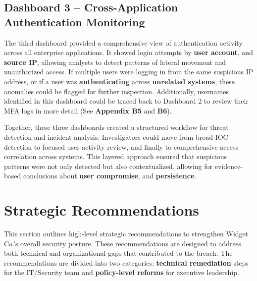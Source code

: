\documentclass[11pt]{article}
\begin{document}
	\subsection{Dashboard 3 – Cross-Application Authentication Monitoring}
	
	\hspace{1.5em} The third dashboard provided a comprehensive view of authentication activity across all enterprise applications. It showed login attempts by \textbf{user account}, and \textbf{source IP}, allowing analysts to detect patterns of lateral movement and unauthorized access. If multiple users were logging in from the same suspicious IP address, or if a user was \textbf{authenticating} across \textbf{unrelated systems}, these anomalies could be flagged for further inspection. Additionally, usernames identified in this dashboard could be traced back to Dashboard 2 to review their MFA logs in more detail (See \textbf{Appendix B5} and \textbf{B6}).
	
	\vspace{1em}
	\hspace{1.5em} Together, these three dashboards created a structured workflow for threat detection and incident analysis. Investigators could move from broad IOC detection to focused user activity review, and finally to comprehensive access correlation across systems. This layered approach ensured that suspicious patterns were not only detected but also contextualized, allowing for evidence-based conclusions about \textbf{user compromise}, and \textbf{persistence}.
	
	\newpage
	\section{Strategic Recommendations}
	
	\hspace{1.5em} This section outlines high-level strategic recommendations to strengthen Widget Co.’s overall security posture. These recommendations are designed to address both technical and organizational gaps that contributed to the breach. The recommendations are divided into two categories: \textbf{technical remediation} steps for the IT/Security team and \textbf{policy-level reforms} for executive leadership.
	
\end{document}
